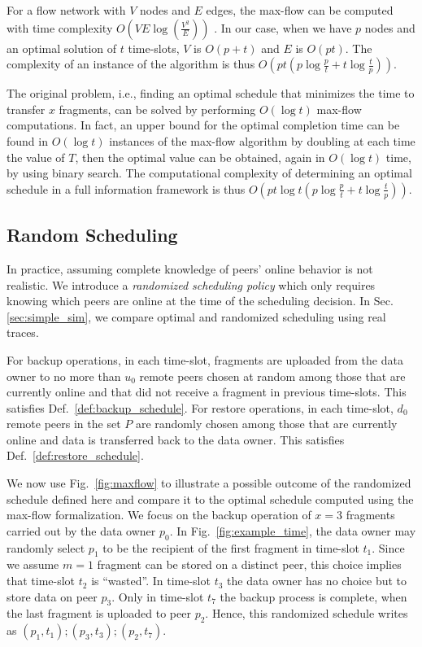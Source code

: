 \documentclass[conference,10pt]{IEEEtran}
\begin{document}
For a flow network with $V$ nodes and $E$ edges, the max-flow can be computed with time complexity $O\left(VE \log\left(\frac{V^2}{E}\right)\right)$ \cite{12144}. In our case, when we have $p$ nodes and an optimal solution of $t$ time-slots, $V$ is $O(p+t)$ and $E$ is $O(pt)$. The complexity of an instance of the algorithm is thus $O\left(pt\left(p \log \frac p t + t \log \frac t p\right)\right)$.

The original problem, i.e., finding an optimal schedule that minimizes
the time to transfer $x$ fragments, can be solved by performing
$O(\log t)$ max-flow computations. In fact, an upper bound for the
optimal completion time can be found in $O(\log t)$ instances of the
max-flow algorithm by doubling at each time the value of $T$, then the
optimal value can be obtained, again in $O(\log t)$ time, by using
binary search. The computational complexity of determining an optimal
schedule in a full information framework is thus $O\left(pt\log
t\left(p \log \frac p t + t \log \frac t p\right)\right)$.

\subsection{Random Scheduling}

In practice, assuming complete knowledge of peers' online behavior is
not realistic. We introduce a \emph{randomized scheduling policy}
which only requires knowing which peers are online at the time of the
scheduling decision. In Sec. \ref{sec:simple_sim}, we compare
optimal and randomized scheduling using real traces.

For backup operations, in each time-slot, fragments are uploaded from
the data owner to no more than $u_0$ remote peers chosen at random
among those that are currently online and that did not receive a
fragment in previous time-slots. This satisfies
Def.~\ref{def:backup_schedule}. For restore operations, in each
time-slot, $d_0$ remote peers in the set $P$ are randomly chosen among
those that are currently online and data is transferred back to the
data owner. This satisfies Def.~\ref{def:restore_schedule}.

We now use Fig.~\ref{fig:maxflow} to illustrate a possible outcome of
the randomized schedule defined here and compare it to the optimal
schedule computed using the max-flow formalization. We focus on the
backup operation of $x=3$ fragments carried out by the data owner
$p_0$. In Fig.~\ref{fig:example_time}, the data owner may randomly
select $p_1$ to be the recipient of the first fragment in time-slot
$t_1$. Since we assume $m=1$ fragment can be stored on a distinct
peer, this choice implies that time-slot $t_2$ is ``wasted''. In
time-slot $t_3$ the data owner has no choice but to store data on peer
$p_3$. Only in time-slot $t_7$ the backup process is complete, when
the last fragment is uploaded to peer $p_2$. Hence, this randomized
schedule writes as $(p_1,t_1);(p_3,t_3);(p_2,t_7)$.
\end{document}
